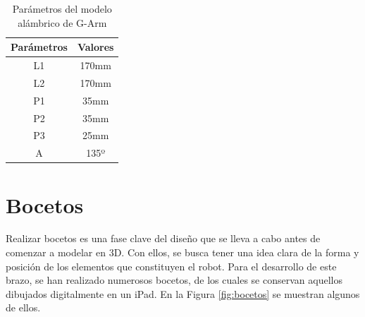 \begin{table}[H]
\begin{center}
\begin{tabular}{|c|c|}
\hline
\textbf{Parámetros} & \textbf{Valores} \\
\hline
L1 & 170mm \\
L2 & 170mm \\
P1 & 35mm \\
P2 & 35mm \\
P3 & 25mm \\
A & 135º \\
\hline
\end{tabular}
\caption{Parámetros del modelo alámbrico de G-Arm}
\label{cuadro:parametros_alambrico}
\end{center}
\end{table}
\newpage
\section{Bocetos}
\noindent Realizar bocetos es una fase clave del diseño que se lleva a cabo antes de comenzar a modelar en 3D. Con ellos, se busca tener una idea 
clara de la forma 
y posición de los elementos que constituyen el robot.  
Para el desarrollo de este brazo, se han realizado numerosos bocetos, de los cuales se conservan aquellos dibujados digitalmente en 
un iPad. En la Figura \ref{fig:bocetos} se muestran algunos de ellos.

